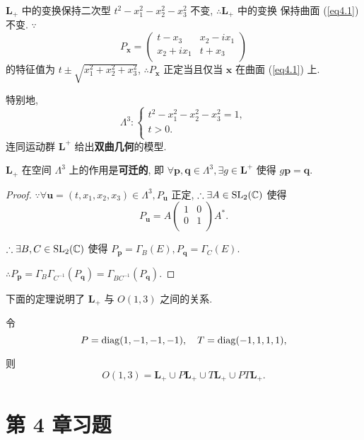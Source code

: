 \documentclass[color=black,device=normal,lang=cn,mode=geye]{elegantnote}
\begin{document}
$\boldsymbol{L}_+$ 中的变换保持二次型 $t^2-x_1^2-x_2^2-x_3^2$ 不变, $\therefore\boldsymbol{L}_+$ 中的变换 保持曲面 (\ref{eq4.1}) 不变. $\because$
\[P_{\boldsymbol{x}}=\begin{pmatrix}
    t-x_3 & x_2-ix_1 \\
    x_2+ix_1 & t+x_3 \\
\end{pmatrix}\]
的特征值为 $t\pm\sqrt{x_1^2+x_2^2+x_3^2}$, $\therefore P_{\boldsymbol{x}}$ 正定当且仅当 $\boldsymbol{x}$ 在曲面 (\ref{eq4.1}) 上.

特别地, 
\[\Lambda^3:\begin{cases}
    t^2-x_1^2-x_2^2-x_3^2=1, \\
    t>0. \\
\end{cases}\]
连同运动群 $\boldsymbol{L}^+$ 给出\textbf{双曲几何}的模型.
\begin{theorem}
    $\boldsymbol{L}_+$ 在空间 $\Lambda^3$ 上的作用是\textbf{可迁的}, 即 $\forall\boldsymbol{p},\boldsymbol{q}\in\Lambda^3,\exists g\in\boldsymbol{L}^+$ 使得 $g\boldsymbol{p}=\boldsymbol{q}$.
\end{theorem}
\begin{proof}
    $\because\forall\boldsymbol{u}=(t,x_1,x_2,x_3)\in\Lambda^3,P_{\boldsymbol{u}}$ 正定, $\therefore\exists A\in\operatorname{SL} _2(\mathbb{C})$ 使得
    \[P_{\boldsymbol{u}}=A\begin{pmatrix}
        1 & 0 \\
        0 & 1 \\
    \end{pmatrix}A^*.\]

    $\therefore\exists B,C\in\operatorname{SL} _2(\mathbb{C})$ 使得 $P_{\boldsymbol{p}}=\Gamma_B(E),P_{\boldsymbol{q}}=\Gamma_C(E)$.

    $\therefore P_{\boldsymbol{p}}=\Gamma_B\Gamma_{C^{-1}}(P_{\boldsymbol{q}})=\Gamma_{BC^{-1}}(P_{\boldsymbol{q}})$.
\end{proof}
下面的定理说明了 $\boldsymbol{L}_+$ 与 $O(1,3)$ 之间的关系.
\begin{theorem}
    令
    \[P=\operatorname{diag} (1,-1,-1,-1),\quad T=\operatorname{diag} (-1,1,1,1),\]

    则
    \[O(1,3)=\boldsymbol{L}_+\cup P\boldsymbol{L}_+\cup T\boldsymbol{L}_+\cup PT\boldsymbol{L}_+.\]
\end{theorem}
\section{第 4 章习题}
\end{document}
